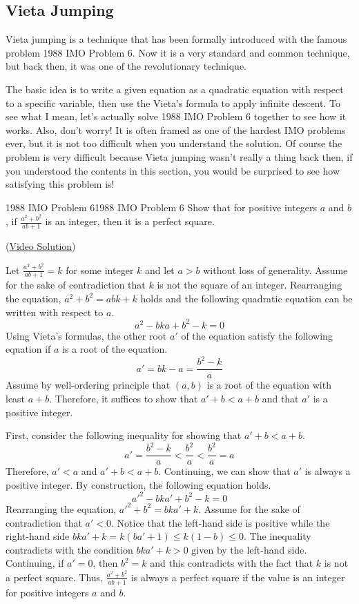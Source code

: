 \documentclass[../../../main.tex]{subfiles}
\begin{document}
\subsection{Vieta Jumping}

Vieta jumping is a technique that has been formally introduced
with the famous problem 1988 IMO Problem 6. Now it is a very
standard and common technique, but back then, it was one of the
revolutionary technique.

The basic idea is to write a given equation as a quadratic
equation with respect to a specific variable, then use the
Vieta's formula to apply infinite descent. To see what I mean,
let's actually solve 1988 IMO Problem 6 together to see how it
works. Also, don't worry! It is often framed as one of the
hardest IMO problems ever, but it is not too difficult when you
understand the solution. Of course the problem is very difficult
because Vieta jumping wasn't really a thing back then, if you
understood the contents in this section, you would be surprised
to see how satisfying this problem is!

\begin{problem}{1988 IMO Problem 6}{1988 IMO Problem 6}
Show that for positive integers $a$ and $b$, if
$\frac{a^2 + b^2}{ab + 1}$ is an integer, then it is a perfect
square.
\end{problem}
(\href{https://youtu.be/rU1e7ttQmh4}{Video Solution})
\begin{solution}
Let $\frac{a^2 + b^2}{ab + 1} = k$ for some integer $k$ and let
$a > b$ without loss of generality. Assume for the sake of
contradiction that $k$ is not the square of an integer.
Rearranging the equation, $a^2 + b^2 = abk + k$ holds and the
following quadratic equation can be written with respect to $a$.
\[
a^2 - bka + b^2 - k = 0
\]
Using Vieta's formulas, the other root $a'$ of the equation satisfy
the following equation if $a$ is a root of the equation.
\[
a'
= bk - a
= \frac{b^2 - k}{a}
\]
Assume by well-ordering principle that $(a, b)$ is a root of the
equation with least $a + b$. Therefore, it suffices to show that
$a' + b < a + b$ and that $a'$ is a positive integer.

First, consider the following inequality for showing that
$a' + b < a + b$.
\[
a'
= \frac{b^2 - k}{a}
< \frac{b^2}{a}
< \frac{b^2}{a}
= a
\]
Therefore, $a' < a$ and $a' + b < a + b$. Continuing, we can show
that $a'$ is always a positive integer. By construction, the following
equation holds.
\[
a'^2 - bka' + b^2 - k = 0
\]
Rearranging the equation, $a'^2 + b^2 = bka' + k$. Assume for the
sake of contradiction that $a' < 0$. Notice that the left-hand
side is positive while the right-hand side $bka' + k = k(ba' + 1) \leq
k(1 - b) \leq 0$. The inequality contradicts with the condition
$bka' + k > 0$ given by the left-hand side. Continuing, if $a' = 0$,
then $b^2 = k$ and this contradicts with the fact that $k$ is not
a perfect square. Thus, $\frac{a^2 + b^2}{ab + 1}$ is always a
perfect square if the value is an integer for positive integers
$a$ and $b$.
\end{solution}
\end{document}

